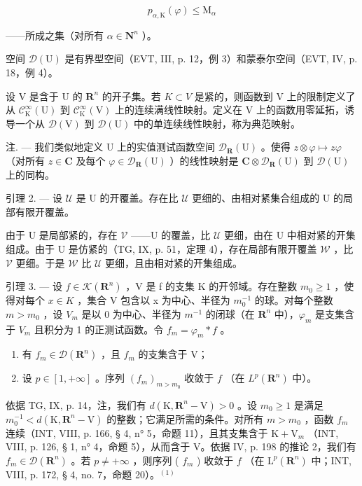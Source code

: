 \[
p _ {\alpha , \mathrm{K}} (\varphi) \leqslant \mathrm{M} _ {\alpha}
\]

——所成之集（对所有 \(\alpha\in\mathbf{N}^{n}\) ）。

空间 \(\mathcal{D}(\mathrm{U})\) 是有界型空间（EVT, III, p. 12，例 3）和蒙泰尔空间（EVT, IV, p. 18，例 4）。

设 V 是含于 U 的 \(\mathbf{R}^{n}\) 的开子集。若 \(K \subset V\) 是紧的，则函数到 V 上的限制定义了从 \(\mathcal{C}_{\mathrm{K}}^{\infty}(\mathrm{U})\) 到 \(\mathcal{C}_{\mathrm{K}}^{\infty}(\mathrm{V})\) 上的连续满线性映射。定义在 V 上的函数用零延拓，诱导一个从 \(\mathcal{D}(\mathrm{V})\) 到 \(\mathcal{D}(\mathrm{U})\) 中的单连续线性映射，称为典范映射。

注. --- 我们类似地定义 U 上的实值测试函数空间 \(\mathcal{D}_{\mathbf{R}}(\mathrm{U})\) 。使得 \(z \otimes \varphi \mapsto z\varphi\) （对所有 \(z \in \mathbf{C}\) 及每个 \(\varphi \in \mathcal{D}_{\mathbf{R}}(\mathrm{U})\) ）的线性映射是 \(\mathbf{C} \otimes \mathcal{D}_{\mathbf{R}}(\mathrm{U})\) 到 \(\mathcal{D}(\mathrm{U})\) 上的同构。

引理 2. --- 设 \(\mathcal{U}\) 是 U 的开覆盖。存在比 \(\mathcal{U}\) 更细的、由相对紧集合组成的 U 的局部有限开覆盖。

由于 U 是局部紧的，存在 \(\mathcal{V}\) ——U 的覆盖，比 \(\mathcal{U}\) 更细，由在 U 中相对紧的开集组成。由于 U 是仿紧的（TG, IX, p. 51，定理 4），存在局部有限开覆盖 \(\mathcal{W}\) ，比 \(\mathcal{V}\) 更细。于是 \(\mathcal{W}\) 比 \(\mathcal{U}\) 更细，且由相对紧的开集组成。

引理 3. --- 设 \(f \in \mathcal{K}(\mathbf{R}^n)\) ，V 是 f 的支集 K 的开邻域。存在整数 \(m_0 \geqslant 1\) ，使得对每个 \(x \in K\) ，集合 V 包含以 x 为中心、半径为 \(m_0^{-1}\) 的球。对每个整数 \(m > m_0\) ，设 \(V_m\) 是以 0 为中心、半径为 \(m^{-1}\) 的闭球（在 \(\mathbf{R}^{n}\) 中），\(\varphi_{m}\) 是支集含于 \(V_{m}\) 且积分为 1 的正测试函数。令 \(f_{m} = \varphi_{m} * f\) 。

\begin{enumerate}
\def\labelenumi{\alph{enumi})}
\item
  有 \(f_{m}\in \mathcal{D}(\mathbf{R}^{n})\) ，且 \(f_{m}\) 的支集含于 V；
\item
  设 \(p \in [1, +\infty]\) 。序列 \((f_m)_{m > m_0}\) 收敛于 \(f\) （在 \(L^p(\mathbf{R}^n)\) 中）。
\end{enumerate}

依据 TG, IX, p. 14，注，我们有 \(d(\mathrm{K}, \mathbf{R}^{n}-\mathrm{V}) > 0\) 。设 \(m_{0} \geqslant 1\) 是满足 \(m_{0}^{-1} < d(\mathrm{K}, \mathbf{R}^{n}-\mathrm{V})\) 的整数；它满足所需的条件。对所有 \(m > m_{0}\) ，函数 \(f_{m}\) 连续（INT, VIII, p. 166, § 4, n° 5，命题 11），且其支集含于 \(\mathrm{K} + \mathrm{V}_{m}\) （INT, VIII, p. 126, § 1, n° 4，命题 5），从而含于 V。依据 IV, p. 198 的推论 2，我们有 \(f_{m} \in \mathcal{D}(\mathbf{R}^{n})\) 。若 \(p \neq +\infty\) ，则序列 ( \(f_{m}\) ) 收敛于 \(f\) （在 \(\mathrm{L}^{p}(\mathbf{R}^{n})\) 中；INT, VIII, p. 172, § 4, no. 7，命题 20）。\(^{(1)}\)

